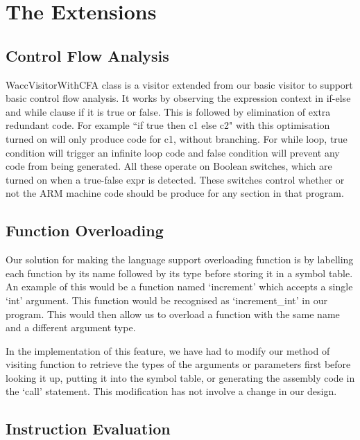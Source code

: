 \documentclass[11pt]{article}
\begin{document}
\section{The Extensions}

\subsection{Control Flow Analysis}

WaccVisitorWithCFA class is a visitor extended from our basic visitor to support basic control flow analysis. It works by observing the expression context in if-else and while clause if it is true or false. This is followed by elimination of extra redundant code. For example ``if true then c1 else c2" with this optimisation turned on will only produce code for c1, without branching. For while loop, true condition will trigger an infinite loop code and false condition will prevent any code from being generated. All these operate on Boolean switches, which are turned on when a true-false expr is detected. These switches control whether or not the ARM machine code should be produce for any section in that program. 

\subsection{Function Overloading}

Our solution for making the language support overloading function is by labelling each function by its name followed by its type before storing it in a symbol table. An example of this would be a function named `increment' which accepts a single `int' argument. This function would be recognised as `increment\_int' in our program. This would then allow us to overload a function with the same name and a different argument type.

\medskip 

In the implementation of this feature, we have had to modify our method of visiting function to retrieve the types of the arguments or parameters first before looking it up, putting it into the symbol table, or generating the assembly code in the `call' statement. This modification has not involve a change in our design.

\subsection{Instruction Evaluation}
\end{document}
